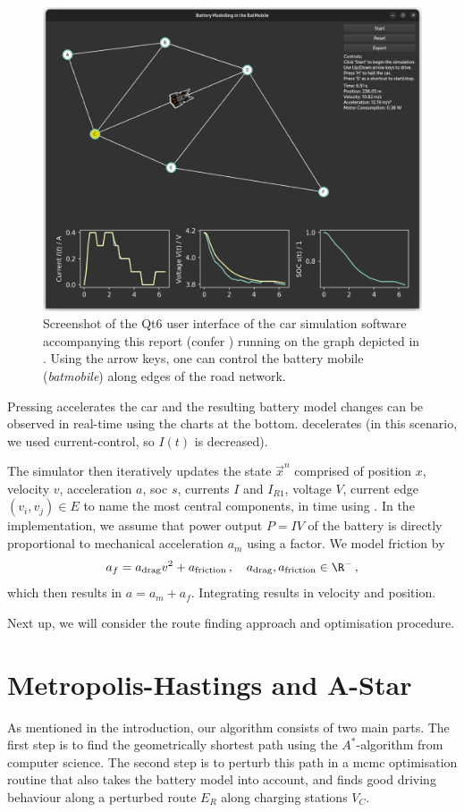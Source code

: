 \documentclass{prettytex/ox/mmsc-special-topic}
\begin{document}
  \begin{figure}[H]
    \centering
    \includegraphics[width=0.65\linewidth]{figures/screenshot.png}
    \caption{Screenshot of the Qt6 user interface of the car simulation software accompanying this report (confer ) running on the graph depicted in . Using the arrow keys, one can control the battery mobile (\textit{batmobile}) along edges of the road network.}
    \label{fig:user-interface}
  \end{figure}

  Pressing \keys{$\uparrow$} accelerates the car and the resulting battery model changes can be observed in real-time using the charts at the bottom. \keys{$\downarrow$} decelerates (in this scenario, we used current-control, so $I(t)$ is decreased).

  The simulator then iteratively updates the state $\vec{x}^n$ comprised of position $x$, velocity $v$, acceleration $a$, \glsdesc{soc} $s$, currents $I$ and $I_{R1}$, voltage $V$, current edge $(v_i, v_j) \in E$ to name the most central components, in time using .
  In the implementation, we assume that power output $P = IV$ of the battery is directly proportional to mechanical acceleration $a_m$ using a factor.
  We model friction by
  $$a_f = a_{\rm drag} v^2 + a_{\rm friction}\,,\quad a_{\rm drag}, a_{\rm friction} \in \R^-\,,$$
  which then results in $a = a_m + a_f$.
  Integrating results in velocity and position.

  Next up, we will consider the route finding approach and optimisation procedure.

  \section{Metropolis-Hastings and A-Star}
  As mentioned in the introduction, our algorithm consists of two main parts.
  The first step is to find the geometrically shortest path using the $A^*$-algorithm from computer science.
  The second step is to perturb this path in a \gls{mcmc} optimisation routine that also takes the battery model into account, and finds good driving behaviour along a perturbed route $E_R$ along charging stations $V_C$.
\end{document}
